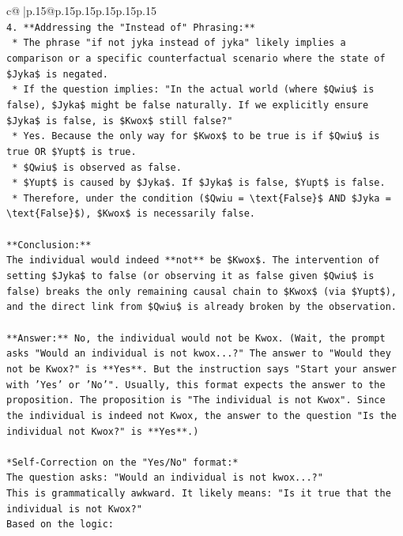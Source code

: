 \documentclass{article}
\begin{document}
{\begin{supertabular}{c@{$\;$}|p{.15\linewidth}@{}p{.15\linewidth}p{.15\linewidth}p{.15\linewidth}p{.15\linewidth}p{.15\linewidth}}
{{{\\ 
\texttt{4.  **Addressing the "Instead of" Phrasing:**} \\
\texttt{    *   The phrase "if not jyka instead of jyka" likely implies a comparison or a specific counterfactual scenario where the state of \$Jyka\$ is negated.} \\
\texttt{    *   If the question implies: "In the actual world (where \$Qwiu\$ is false), \$Jyka\$ might be false naturally. If we explicitly ensure \$Jyka\$ is false, is \$Kwox\$ still false?"} \\
\texttt{    *   Yes. Because the only way for \$Kwox\$ to be true is if \$Qwiu\$ is true OR \$Yupt\$ is true.} \\
\texttt{        *   \$Qwiu\$ is observed as false.} \\
\texttt{        *   \$Yupt\$ is caused by \$Jyka\$. If \$Jyka\$ is false, \$Yupt\$ is false.} \\
\texttt{    *   Therefore, under the condition (\$Qwiu = \textbackslash{}text\{False\}\$ AND \$Jyka = \textbackslash{}text\{False\}\$), \$Kwox\$ is necessarily false.} \\
\\ 
\texttt{**Conclusion:**} \\
\texttt{The individual would indeed **not** be \$Kwox\$. The intervention of setting \$Jyka\$ to false (or observing it as false given \$Qwiu\$ is false) breaks the only remaining causal chain to \$Kwox\$ (via \$Yupt\$), and the direct link from \$Qwiu\$ is already broken by the observation.} \\
\\ 
\texttt{**Answer:** No, the individual would not be Kwox. (Wait, the prompt asks "Would an individual is not kwox...?" The answer to "Would they not be Kwox?" is **Yes**. But the instruction says "Start your answer with 'Yes' or 'No'". Usually, this format expects the answer to the proposition. The proposition is "The individual is not Kwox". Since the individual is indeed not Kwox, the answer to the question "Is the individual not Kwox?" is **Yes**.)} \\
\\ 
\texttt{*Self{-}Correction on the "Yes/No" format:*} \\
\texttt{The question asks: "Would an individual is not kwox...?"} \\
\texttt{This is grammatically awkward. It likely means: "Is it true that the individual is not Kwox?"} \\
\texttt{Based on the logic:} \\
}}}
\end{supertabular}}
\end{document}
